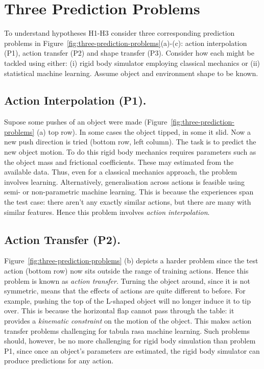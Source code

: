 \section{Three Prediction Problems	}
\label{sec:schema}

To understand hypotheses H1-H3 consider three corresponding prediction problems in Figure~\ref{fig:three-prediction-problems}(a)-(c): action interpolation (P1), action transfer (P2) and shape transfer (P3). Consider how each might be tackled using either: (i) rigid body simulator employing classical mechanics or (ii) statistical machine learning. Assume object and environment shape to be known.

\subsection{Action Interpolation (P1).} Supose some pushes of an object were made (Figure~\ref{fig:three-prediction-problems} (a) top row). In some cases the object tipped, in some it slid. Now a new push direction is tried (bottom row, left column). The task is to predict the new object motion. To do this rigid body mechanics requires parameters such as the object mass and frictional coefficients. These may estimated from the available data. Thus, even for a classical mechanics approach, the problem involves learning. Alternatively, generalisation across actions is feasible using semi- or non-parametric machine learning. This is because the experiences span the test case: there aren't any exactly similar actions, but there are many with similar features. Hence this problem involves {\em action interpolation}.

\subsection{Action Transfer (P2).} Figure~\ref{fig:three-prediction-problems} (b) depicts a harder problem since the test action (bottom row) now sits outside the range of training actions. Hence this problem is known as {\em action transfer}. Turning the object around, since it is not symmetric, means that the effects of actions are quite different to before. For example, pushing the top of the L-shaped object will no longer induce it to tip over. This is because the horizontal flap cannot pass through the table: it provides a {\em kinematic constraint} on the motion of the object. This makes action transfer problems challenging for tabula rasa machine learning. Such problems should, however, be no more challenging for rigid body simulation than problem P1, since once an object's parameters are estimated, the rigid body simulator can produce predictions for any action.

